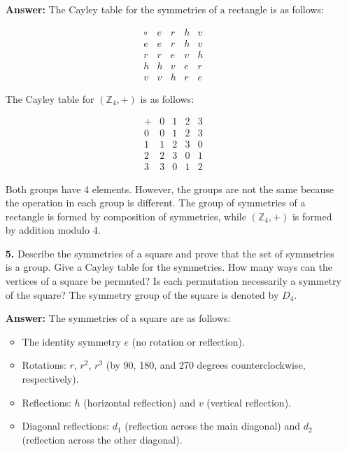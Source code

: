 \documentclass[12pt,reqno]{amsart}
\begin{document}
\begin{enumerate}
\textbf{Answer:} The Cayley table for the symmetries of a rectangle is as follows:

\[
\begin{array}{c|cccc}
\circ & e & r & h & v \\
\hline
e & e & r & h & v \\
r & r & e & v & h \\
h & h & v & e & r \\
v & v & h & r & e
\end{array}
\]

The Cayley table for $({\mathbb Z}_4, +)$ is as follows:

\[
\begin{array}{c|cccc}
+ & 0 & 1 & 2 & 3 \\
\hline
0 & 0 & 1 & 2 & 3 \\
1 & 1 & 2 & 3 & 0 \\
2 & 2 & 3 & 0 & 1 \\
3 & 3 & 0 & 1 & 2
\end{array}
\]

Both groups have 4 elements. However, the groups are not the same because the operation in each group is different. The group of symmetries of a rectangle is formed by composition of symmetries, while $({\mathbb Z}_4, +)$ is formed by addition modulo 4.

\medskip

\item[{\bf 5.}]
Describe the symmetries of a square and prove that the set of
symmetries is a group. Give a Cayley table for the symmetries. How
many ways can the vertices of a square be permuted?  Is each
permutation necessarily a symmetry of the square?  The symmetry group
of the square is denoted by $D_4$.

\textbf{Answer:} The symmetries of a square are as follows:
\begin{itemize}
    \item The identity symmetry $e$ (no rotation or reflection).
    \item Rotations: $r$, $r^2$, $r^3$ (by 90, 180, and 270 degrees counterclockwise, respectively).
    \item Reflections: $h$ (horizontal reflection) and $v$ (vertical reflection).
    \item Diagonal reflections: $d_1$ (reflection across the main diagonal) and $d_2$ (reflection across the other diagonal).
\end{itemize}


\end{enumerate}
\end{document}
